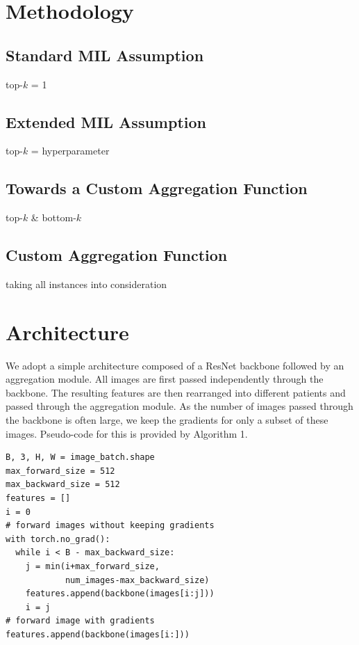 \documentclass[final]{cvpr}
\begin{document}
	\section{Methodology}
	
	\subsection{Standard MIL Assumption} 
	
	top-$k$ = 1

	\subsection{Extended  MIL Assumption} 
	
	top-$k$ = hyperparameter

	\subsection{Towards a Custom Aggregation Function}
	
	top-$k$ \& bottom-$k$
	
	\subsection{Custom Aggregation Function}
	
	taking all instances into consideration
	
	\section{Architecture}
	We adopt a simple architecture composed of a ResNet backbone followed by an aggregation module.
	All images are first passed independently through the backbone. The resulting features are then rearranged into different patients and passed through the aggregation module.
	As the number of images passed through the backbone is often large, we keep the gradients for only a subset of these images. Pseudo-code for this is provided by Algorithm 1.
	
	\begin{Verbatim}[fontsize=\footnotesize, samepage=true]
B, 3, H, W = image_batch.shape
max_forward_size = 512
max_backward_size = 512
features = []
i = 0
# forward images without keeping gradients
with torch.no_grad():
  while i < B - max_backward_size:
    j = min(i+max_forward_size,
            num_images-max_backward_size)
    features.append(backbone(images[i:j]))
    i = j
# forward image with gradients
features.append(backbone(images[i:]))
	\end{Verbatim}
\end{document}

